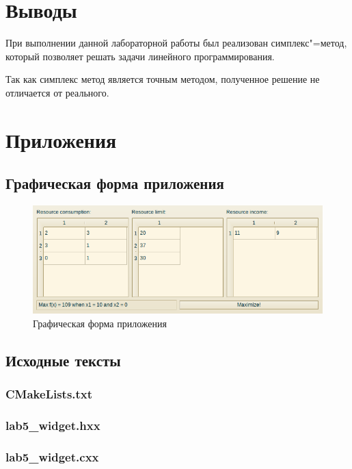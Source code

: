 \documentclass[a4paper,12pt,notitlepage,headsepline,pdftex]{scrartcl}
\begin{document}
\section{Выводы}
  При выполнении данной лабораторной работы был реализован симплекс"=метод,
  который позволяет решать задачи линейного программирования.

  Так как симплекс метод является точным методом, полученное решение не
  отличается от реального.
  \newpage
\section{Приложения}
  \subsection{Графическая форма приложения}
    \begin{figure}[h!]
      \begin{center}
        \includegraphics[width=\textwidth]{scr.png}
      \end{center}
      \caption{Графическая форма приложения}
      \label{fig:gui}
    \end{figure}
  \subsection{Исходные тексты}
    \subsubsection{CMakeLists.txt}
      
    \subsubsection{lab5\_widget.hxx}
      
    \subsubsection{lab5\_widget.cxx}
      
\end{document}
